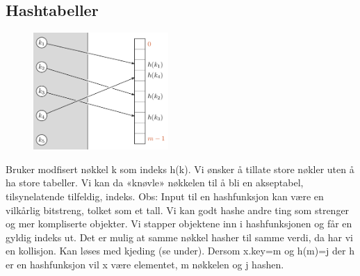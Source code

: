 \documentclass[12pt]{report}
\begin{document}


\vspace{\baselineskip}

\vspace{\baselineskip}

\vspace{\baselineskip}

\vspace{\baselineskip}

\vspace{\baselineskip}
\setlength{\parskip}{15.0pt}

\vspace{\baselineskip}

\vspace{\baselineskip}

\vspace{\baselineskip}\subsection*{Hashtabeller}



\begin{figure}[H]
\advance\leftskip 4.98in		\includegraphics[width=2.02in,height=1.75in]{./media/image18.png}
\end{figure}



\setlength{\parskip}{10.56pt}
Bruker modfisert nøkkel k som indeks h(k). Vi ønsker å tillate store nøkler uten å ha store tabeller. Vi kan da «knøvle» nøkkelen til å bli en akseptabel, tilsynelatende tilfeldig, indeks. Obs: Input til en hashfunksjon kan være en vilkårlig bitstreng, tolket som et tall. Vi kan godt hashe andre ting som strenger og mer kompliserte objekter. Vi stapper objektene inn i hashfunksjonen og får en gyldig indeks ut.  Det er mulig at samme nøkkel hasher til samme verdi, da har vi en kollisjon. Kan løses med kjeding (se under). Dersom x.key=m og h(m)=j der h er en hashfunksjon vil x være elementet, m nøkkelen og j hashen.\par
\end{document}
